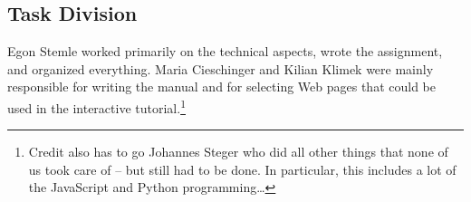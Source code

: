 \documentclass[12pt]{article}
\begin{document}
\subsection{Task Division}

Egon Stemle worked primarily on the technical aspects, wrote the assignment, and organized everything. Maria Cieschinger and Kilian Klimek were mainly responsible for writing the manual and for selecting Web pages that could be used in the interactive tutorial.\footnote{Credit also has to go Johannes Steger who did all other things that none of us took care of -- but still had to be done. In particular, this includes a lot of the JavaScript and Python programming\ldots}

\nocite{*}

\footnotesize


\normalsize

\newpage
\pagestyle{empty}


\end{document}
